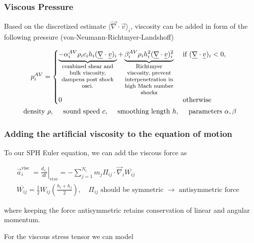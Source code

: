\subsubsection{Viscous Pressure}
Based on the discretized estimate $\langle \vec{\nabla} \cdot \vec{v} \rangle_i$, viscosity can be added
in form of the following pressure (von-Neumann-Richtmyer-Landshoff)

\begin{equation}
    \begin{gathered}
    p_i^{A V}= \begin{cases}\explain{-\alpha_i^{A V} \rho_i c_i h_i(\vec{\nabla} \cdot \vec{v})_i}{combined shear and bulk viscosity, dampens post shock osci.}+\explain{\beta_i^{A V} \rho_i h_i^2(\vec{\nabla} \cdot \vec{v})_i^2}{Richtmyer viscosity, prevent interpenetration in high Mach number shocks} & \text { if }(\vec{\nabla} \cdot \vec{v})_i<0, \\
    0 & \text { otherwise }\end{cases} \\
    \text { density } \rho, \quad \text { sound speed } c, \quad \text { smoothing length } h, \quad \text { parameters } \alpha, \beta
    \end{gathered}
\end{equation}

\subsubsection{Adding the artificial viscosity to the equation of motion}
To our SPH Euler equation, we can add the viscous force as

\begin{equation}
    \begin{gathered}
        \vec{a}_i^{\text {visc }}=\left.\frac{d_{v_1}}{d t}\right|_{v i s c}=-\sum_{j=1}^{N_i} m_j \Pi_{i j} \cdot \vec{\nabla}_i \overline{W_{i j}} \\
        \overline{W_{i j}}=\frac{1}{2} W_{i j}\left(\frac{h_i+h_j}{2}\right), \quad \Pi_{i j} \text { should be symmetric } \rightarrow \text { antisymmetric force }
    \end{gathered}
\end{equation}

where keeping the force antisymmetric retains conservation of linear and angular momentum.

For the viscous stress tensor we can model

